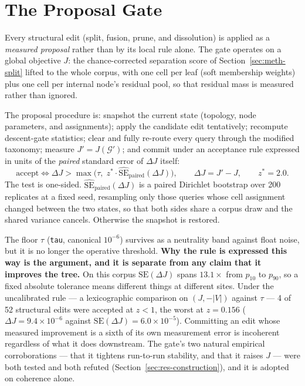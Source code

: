 \section{The Proposal Gate}\label{sec:meth-proposal-gate}

Every structural edit (split, fusion, prune, and dissolution) is
applied as a \emph{measured proposal} rather than by
its local rule alone.
The gate operates on a global objective $J$: the chance-corrected
separation score of Section~\ref{sec:meth-split} lifted to the whole
corpus, with one cell per leaf (soft membership weights) plus one
cell per internal node's residual pool, so that residual mass is
measured rather than ignored.

The proposal procedure is:
snapshot the current state (topology, node
parameters, and assignments); apply the candidate edit tentatively;
recompute descent-gate statistics; clear and fully re-route every
query through the modified taxonomy; measure $J' = J(\mathcal{G}')$;
and commit under an acceptance rule expressed in units of the
\emph{paired} standard error of $\Delta J$ itself:
\[
\text{accept}
\iff
\Delta J > \max\bigl(\tau,\; z^{*}\cdot
\widehat{\mathrm{SE}}_{\text{paired}}(\Delta J)\bigr),
\qquad
\Delta J = J' - J,
\qquad z^{*} = 2.0 .
\]
The test is one-sided.
$\widehat{\mathrm{SE}}_{\text{paired}}(\Delta J)$ is a paired Dirichlet
bootstrap over 200 replicates at a fixed seed, resampling only those
queries whose cell assignment changed between the two states, so that
both sides share a corpus draw and the shared variance cancels.
Otherwise the snapshot is restored.

The floor $\tau$ (\texttt{tau}, canonical $10^{-6}$) survives as a
neutrality band against float noise, but it is no longer the operative
threshold. \textbf{Why the rule is expressed this way is the argument,
and it is separate from any claim that it improves the tree.}
On this corpus $\mathrm{SE}(\Delta J)$ spans $13.1\times$ from
$p_{10}$ to $p_{90}$, so a fixed absolute tolerance means different
things at different sites. Under the uncalibrated rule --- a
lexicographic comparison on $(J, -|V|)$ against $\tau$ --- 4 of 52
structural edits were accepted at $z < 1$, the worst at $z = 0.156$
($\Delta J = 9.4\times10^{-6}$ against
$\mathrm{SE}(\Delta J) = 6.0\times10^{-5}$). Committing an edit whose
measured improvement is a sixth of its own measurement error is
incoherent regardless of what it does downstream.
The gate's two natural empirical corroborations --- that it tightens
run-to-run stability, and that it raises $J$ --- were both tested and
both refuted (Section~\ref{sec:res-construction}), and it is adopted on
coherence alone.

